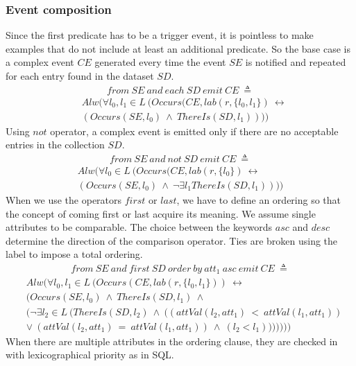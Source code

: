 \subsubsection{Event composition}
Since the first predicate has to be a trigger event, it is pointless to make examples that do not include at least an additional predicate. So the base case is a complex event $CE$ generated every time the event $SE$ is notified and repeated for each entry found in the dataset $SD$.
\begin{align*}%
from\ SE\ and\ each\ SD\ emit\ CE\ \triangleq
\end{align*}
\begin{align*}
&Alw(\forall l_0, l_1 \in L\ (Occurs(CE, lab(r, \{l_0, l_1\})\ \leftrightarrow\\
&(Occurs(SE, l_0)\ \wedge\ ThereIs(SD, l_1))))
\end{align*}
Using $not$ operator, a complex event is emitted only if there are no acceptable entries in the collection $SD$.
\begin{align*}%
from\ SE\ and\ not\ SD\ emit\ CE\ \triangleq
\end{align*}
\begin{align*}
Alw(\forall l_0 \in L\ (Occurs(CE, lab(r, \{l_0\})\ \leftrightarrow\\
(Occurs(SE, l_0)\ \wedge\ \neg \exists l_1 ThereIs(SD, l_1))))
\end{align*}
When we use the operators $first$ or $last$, we have to define an ordering so that the concept of coming first or last acquire its meaning. We assume single attributes to be comparable. The choice between the keywords $asc$ and $desc$ determine the direction of the comparison operator. Ties are broken using the label to impose a total ordering.
\begin{align*}%
from\ SE\ and\ first\ SD\ order\ by\ att_1\ asc\ emit\ CE\ \triangleq
\end{align*}
\begin{align*}
&Alw(\forall l_0, l_1 \in L\ (Occurs(CE, lab(r, \{l_0, l_1\}))\ \leftrightarrow\\
&(Occurs(SE, l_0)\ \wedge\ ThereIs(SD, l_1)\ \wedge\\
&(\neg \exists l_2 \in L\ (ThereIs(SD, l_2)\ \wedge\ ((attVal(l_2, att_1)\ <\ attVal(l_1, att_1))\\
&\lor\ (attVal(l_2, att_1)\ =\ attVal(l_1, att_1))\ \wedge\ (l_2 < l_1)))))))
\end{align*}
When there are multiple attributes in the ordering clause, they are checked in with lexicographical priority as in SQL.
